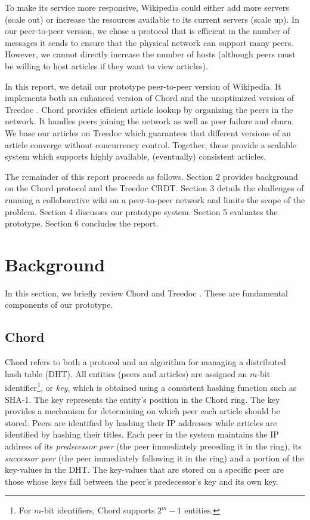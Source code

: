 \documentclass[twocolumn]{article}
\begin{document}
To make its service more responsive, Wikipedia could either add more servers (scale out) or increase the resources available to its current servers (scale up). In our peer-to-peer version, we chose a protocol that is efficient in the number of messages it sends to ensure that the physical network can support many peers. However, we cannot directly increase the number of hosts (although peers must be willing to host articles if they want to view articles).

In this report, we detail our prototype peer-to-peer version of Wikipedia. It implements both an enhanced version of Chord \cite{c1} and the unoptimized version of Treedoc \cite{t1,t2}. Chord provides efficient article lookup by organizing the peers in the network. It handles peers joining the network as well as peer failure and churn. We base our articles on Treedoc which guarantees that different versions of an article converge without concurrency control. Together, these provide a scalable system which supports highly available, (eventually) consistent articles.

The remainder of this report proceeds as follows. Section 2 provides background on the Chord protocol and the Treedoc CRDT. Section 3 details the challenges of running a collaborative wiki on a peer-to-peer network and limits the scope of the problem. Section 4 discusses our prototype system. Section 5 evaluates the prototype. Section 6 concludes the report.

\section{Background}
In this section, we briefly review Chord \cite{c1} and Treedoc \cite{t1}. These are fundamental components of our prototype.

\subsection{Chord}
Chord refers to both a protocol and an algorithm for managing a distributed hash table (DHT). All entities (peers and articles) are assigned an $m$-bit identifier\footnote{For $m$-bit identifiers, Chord supports $2^m-1$ entities.}, or \textit{key}, which is obtained using a consistent hashing function such as SHA-1. The key represents the entity's position in the Chord ring. The key provides a mechanism for determining on which peer each article should be stored. Peers are identified by hashing their IP addresses while articles are identified by hashing their titles. Each peer in the system maintains the IP address of its \textit{predecessor peer} (the peer immediately preceding it in the ring), its \textit{successor peer} (the peer immediately following it in the ring) and a portion of the key-values in the DHT. The key-values that are stored on a specific peer are those whose keys fall between the peer's predecessor's key and its own key.
\end{document}
